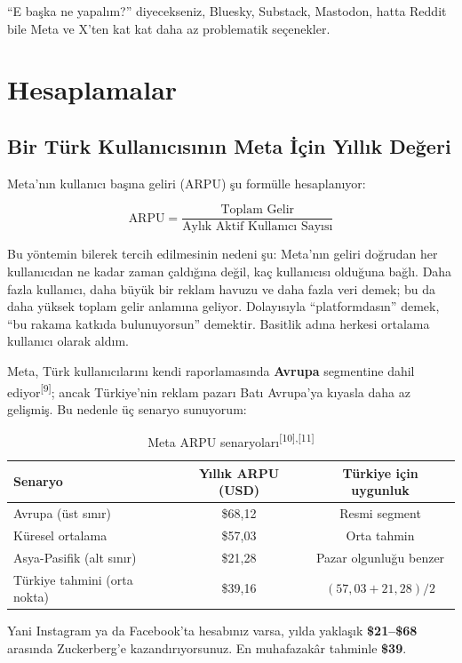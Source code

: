 \documentclass{article}
\begin{document}
``E başka ne yapalım?'' diyecekseniz, Bluesky, Substack, Mastodon, hatta Reddit bile Meta ve X'ten kat kat daha az problematik seçenekler.

\section*{Hesaplamalar}

\subsection*{Bir Türk Kullanıcısının Meta İçin Yıllık Değeri}

Meta'nın kullanıcı başına geliri (ARPU) şu formülle hesaplanıyor:

\[
\text{ARPU} = \frac{\text{Toplam Gelir}}{\text{Aylık Aktif Kullanıcı Sayısı}}
\]

Bu yöntemin bilerek tercih edilmesinin nedeni şu: Meta'nın geliri doğrudan her kullanıcıdan ne kadar zaman çaldığına değil, kaç kullanıcısı olduğuna bağlı. Daha fazla kullanıcı, daha büyük bir reklam havuzu ve daha fazla veri demek; bu da daha yüksek toplam gelir anlamına geliyor. Dolayısıyla ``platformdasın'' demek, ``bu rakama katkıda bulunuyorsun'' demektir. Basitlik adına herkesi ortalama kullanıcı olarak aldım.

Meta, Türk kullanıcılarını kendi raporlamasında \textbf{Avrupa} segmentine dahil ediyor\textsuperscript{[9]}; ancak Türkiye'nin reklam pazarı Batı Avrupa'ya kıyasla daha az gelişmiş. Bu nedenle üç senaryo sunuyorum:

\begin{table}[h]
\centering
\begin{tabular}{lcc}
\toprule
\textbf{Senaryo} & \textbf{Yıllık ARPU (USD)} & \textbf{Türkiye için uygunluk} \\
\midrule
Avrupa (üst sınır)           & \$68,12 & Resmi segment \\
Küresel ortalama             & \$57,03 & Orta tahmin \\
Asya-Pasifik (alt sınır)     & \$21,28 & Pazar olgunluğu benzer \\
\midrule
Türkiye tahmini (orta nokta) & \$39,16 & $(57{,}03 + 21{,}28) / 2$ \\
\bottomrule
\end{tabular}
\caption{Meta ARPU senaryoları\textsuperscript{[10],[11]}}
\end{table}

Yani Instagram ya da Facebook'ta hesabınız varsa, yılda yaklaşık \textbf{\$21--\$68} arasında Zuckerberg'e kazandırıyorsunuz. En muhafazakâr tahminle \textbf{\$39}.
\end{document}
